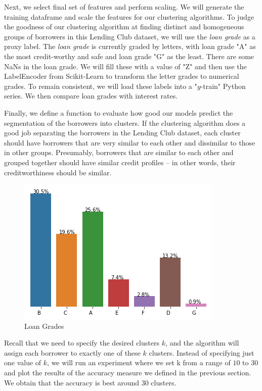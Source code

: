 \documentclass[a4paper,11pt]{amsart}
\begin{document}
\medbreak

Next, we select final set of features and perform scaling. We will generate the training dataframe and scale the features for our clustering algorithms. To judge the goodness of our clustering algorithm at finding distinct and homogeneous groups of borrowers in this Lending Club dataset, we will use the \emph{loan grade} as a proxy label. The \emph{loan grade} is currently graded by letters, with loan grade "A" as the most credit-worthy and safe and loan grade "G" as the least. There are some NaNs in the loan grade. We will fill these with a value of "Z" and then use the LabelEncoder from Scikit-Learn to transform the letter grades to numerical grades. To remain consistent, we will load these labels into a "$y$-train" Python series. We then compare loan grades with interest rates. 

\medbreak

Finally, we define a function to evaluate how good our models predict the segmentation of the borrowers into clusters. If the clustering algorithm does a good job separating the borrowers in the Lending Club dataset, each cluster should have borrowers that are very similar to each other and dissimilar to those in other groups. Presumably, borrowers that are similar to each other and grouped together should have similar credit profiles -- in other words, their creditworthiness should be similar.

\begin{figure}
 \includegraphics[width=.5\linewidth]{download.png}
  \caption{Loan Grades}
  \label{fig:loan}
\end{figure}

\medbreak

 Recall that we need to specify the desired clusters $k$, and the algorithm will assign each borrower to exactly one of these $k$ clusters. Instead of specifying just one value of $k$, we will run an experiment where we set k from a range of $10$ to $30$ and plot the results of the accuracy measure we defined in the previous section. We obtain that the accuracy is best around $30$ clusters.
\end{document}
